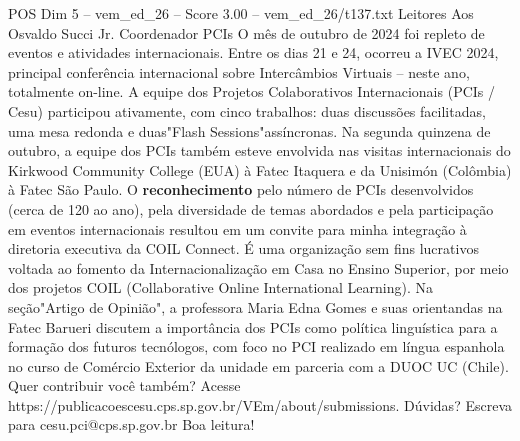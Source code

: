 \begin{textsample}{POS Dim 5 – vem\_ed\_26 – Score 3.00 – vem\_ed\_26/t137.txt}  \label{ex:f5_pos_076}
Leitores Aos Osvaldo Succi Jr.
Coordenador PCIs O mês de outubro de 2024 foi repleto de eventos e atividades internacionais.
Entre os dias 21 e 24, ocorreu a IVEC 2024, principal conferência internacional sobre Intercâmbios Virtuais – neste ano, totalmente on-line.
A equipe dos Projetos Colaborativos Internacionais (PCIs / Cesu) participou ativamente, com cinco trabalhos: duas discussões facilitadas, uma mesa redonda e duas"Flash Sessions"assíncronas.
Na segunda quinzena de outubro, a equipe dos PCIs também esteve envolvida nas visitas internacionais do Kirkwood Community College (EUA) à Fatec Itaquera e da Unisimón (Colômbia) à Fatec São Paulo.
O \textbf{reconhecimento} pelo número de PCIs desenvolvidos (cerca de 120 ao ano), pela diversidade de temas abordados e pela participação em eventos internacionais resultou em um convite para minha integração à diretoria executiva da COIL Connect.
É uma organização sem fins lucrativos voltada ao fomento da Internacionalização em Casa no Ensino Superior, por meio dos projetos COIL (Collaborative Online International Learning).
Na seção"Artigo de Opinião", a professora Maria Edna Gomes e suas orientandas na Fatec Barueri discutem a importância dos PCIs como política linguística para a formação dos futuros tecnólogos, com foco no PCI realizado em língua espanhola no curso de Comércio Exterior da unidade em parceria com a DUOC UC (Chile).
Quer contribuir você também?
Acesse https://publicacoescesu.cps.sp.gov.br/VEm/about/submissions.
Dúvidas?
Escreva para cesu.pci@cps.sp.gov.br Boa leitura!

\end{textsample}
